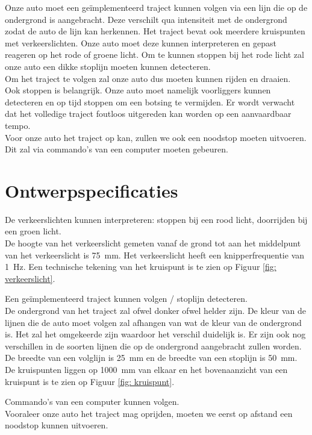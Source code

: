 \documentclass[a4paper,twoside,kulak]{kulakreport}
\begin{document}
	Onze auto moet een geïmplementeerd traject kunnen volgen via een lijn die op de ondergrond is aangebracht. Deze verschilt qua intensiteit met de ondergrond zodat de auto de lijn kan herkennen. Het traject bevat ook meerdere kruispunten met verkeerslichten. Onze auto moet deze kunnen interpreteren en gepast reageren op het rode of groene licht. Om te kunnen stoppen bij het rode licht zal onze auto een dikke stoplijn moeten kunnen detecteren. \\

	Om het traject te volgen zal onze auto dus moeten kunnen rijden en draaien. Ook stoppen is belangrijk. Onze auto moet namelijk voorliggers kunnen detecteren en op tijd stoppen om een botsing te vermijden. Er wordt verwacht dat het volledige traject foutloos uitgereden kan worden op een aanvaardbaar tempo. \\

	Voor onze auto het traject op kan, zullen we ook een noodstop moeten uitvoeren. Dit zal via commando's van een computer moeten gebeuren.

	\newpage
	\section{Ontwerpspecificaties}
	 	De verkeerslichten kunnen interpreteren: stoppen bij een rood licht, doorrijden bij een groen licht.\\
	 De hoogte van het verkeerslicht gemeten vanaf de grond tot aan het middelpunt van het verkeerslicht is 75~mm. Het verkeerslicht heeft een knipperfrequentie van 1~Hz. Een technische tekening van het kruispunt is te zien op Figuur \ref{fig: verkeerslicht}.
	 \bigskip
	 
	 
	 
	 Een geïmplementeerd traject kunnen volgen / stoplijn detecteren.\\
	 De ondergrond van het traject zal ofwel donker ofwel helder zijn. De kleur van de lijnen die de auto moet volgen zal afhangen van wat de kleur van de ondergrond is. Het zal het omgekeerde zijn waardoor het verschil duidelijk is. Er zijn ook nog verschillen in de soorten lijnen die op de ondergrond aangebracht zullen worden. De breedte van een volglijn is 25~mm en de breedte van een stoplijn is 50~mm. De kruispunten liggen op 1000~mm van elkaar en het bovenaanzicht van een kruispunt is te zien op Figuur \ref{fig: kruispunt}. 
	 
	 
	 \bigskip
	 
	 
	 Commando's van een computer kunnen volgen.\\
	 Vooraleer onze auto het traject mag oprijden, moeten we eerst op afstand een noodstop kunnen uitvoeren. 
	 
\end{document}
